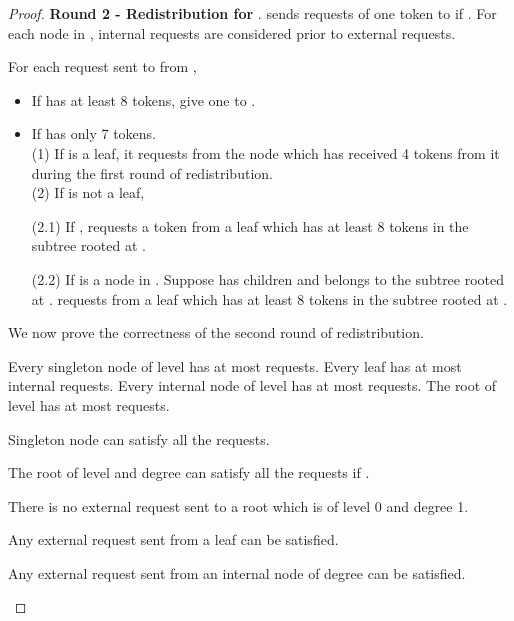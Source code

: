 \documentclass[runningheads,a4paper]{llncs}
\numberwithin{equation}{section}
\begin{document}
\begin{proof}
\textbf{Round 2 - Redistribution for }.  sends  requests of one token to  if . For each node  in , internal requests are considered prior to external requests.

        For each request sent to  from ,
        \begin{itemize}
            \item If  has at least 8 tokens, give one to .
            \item If  has only 7 tokens. \\
            (1) If  is a leaf, it requests from the node which has received 4 tokens from it during the first round of redistribution.\\
            (2) If  is not a leaf,

            (2.1) If ,  requests a token from a leaf which has at least 8 tokens in the subtree rooted at .  

            (2.2) If  is a node in . Suppose  has children  and  belongs to the subtree rooted at .  requests from a leaf  which has at least 8 tokens in the subtree rooted at .
        \end{itemize}


We now prove the correctness of the second round of redistribution.

\begin{proposition}
Every singleton node  of level  has at most  requests. Every leaf has at most  internal requests. Every internal node of level  has at most  requests. The root of level  has at most  requests.
\end{proposition}


\begin{proposition}
Singleton node  can satisfy all the requests.
\end{proposition}


\begin{proposition}
The root  of level  and degree  can satisfy all the requests if .
\end{proposition}


\begin{proposition}
There is no external request sent to a root which is of level 0 and degree 1.
\end{proposition}


\begin{proposition}
Any external request sent from a leaf  can be satisfied.
\end{proposition}


\begin{proposition}
Any external request sent from an internal node of degree  can be satisfied.
\end{proposition}


\end{proof}
\end{document}
